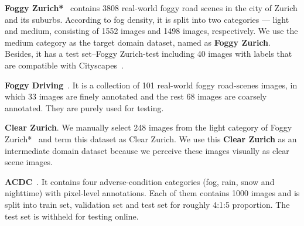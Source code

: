 \documentclass[10pt,twocolumn,letterpaper]{article}
\begin{document}
\noindent\textbf{Foggy Zurich*}~\cite{sakaridis2018model} contains 3808 real-world foggy road scenes in the city of Zurich and its suburbs. 
According to fog density, it is split into two categories --- light and medium, consisting of 1552 images and 1498 images, respectively. We use the medium category as the target domain dataset, named as \textbf{Foggy Zurich}. Besides, it has a test set--Foggy Zurich-test including 40 images with labels that are compatible with Cityscapes~\cite{marius2016cityscapes}.

\noindent\textbf{Foggy Driving}~\cite{sakaridis2018model}. It is a collection of 101 real-world foggy road-scenes images, in which 33 images are finely annotated and the rest 68 images are coarsely annotated. They are purely used for testing. 
    
\noindent\textbf{Clear Zurich}. We manually select 248 images from the light category of Foggy Zurich*~\cite{sakaridis2018model} and term this dataset as Clear Zurich. We use this \textbf{Clear Zurich} as an intermediate domain dataset because we perceive these images visually as clear scene images.
 
\noindent\textbf{ACDC}~\cite{ACDC}. It contains four adverse-condition categories (fog, rain, snow and nighttime) with pixel-level annotations. Each of them contains 1000 images and is split into train set, validation set and test set for roughly 4:1:5 proportion. The test set is withheld for testing online. 
\end{document}
